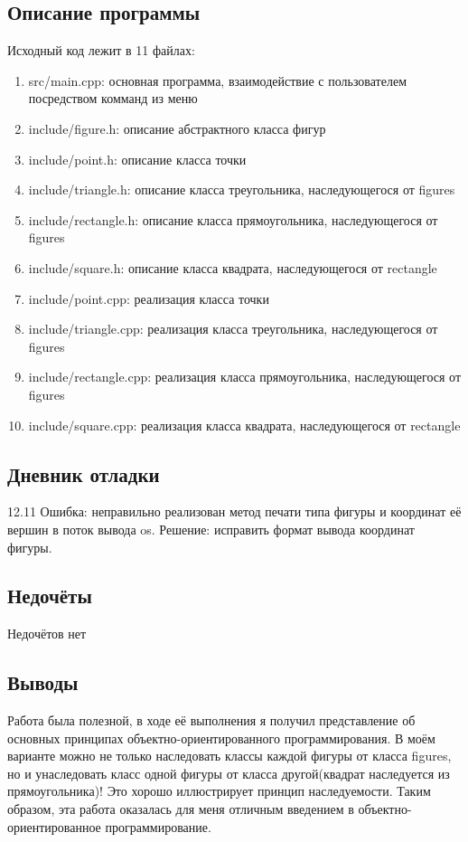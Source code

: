 \documentclass[12pt]{article}
\begin{document}
\subsection*{Описание программы}

Исходный код лежит в 11 файлах:
\begin{enumerate}
\item src/main.cpp: основная программа, взаимодействие с пользователем посредством комманд из меню

\item include/figure.h:    описание абстрактного класса фигур

\item include/point.h:     описание класса точки
\item include/triangle.h:  описание класса треугольника, наследующегося от figures
\item include/rectangle.h: описание класса прямоугольника, наследующегося от figures
\item include/square.h:    описание класса квадрата, наследующегося от rectangle

\item include/point.cpp:     реализация класса точки
\item include/triangle.cpp:  реализация класса треугольника, наследующегося от figures
\item include/rectangle.cpp: реализация класса прямоугольника, наследующегося от figures
\item include/square.cpp:    реализация класса квадрата, наследующегося от rectangle

\end{enumerate}

\subsection*{Дневник отладки}
12.11 Ошибка: неправильно реализован метод печати типа фигуры и координат её вершин в поток вывода os.
\newline Решение: исправить формат вывода координат фигуры.

\subsection*{Недочёты}
Недочётов нет

\subsection*{Выводы}
Работа была полезной, в ходе её выполнения я получил представление об основных принципах объектно-ориентированного программирования. В моём варианте можно не только наследовать классы каждой фигуры от класса figures, но и унаследовать класс одной фигуры от класса другой(квадрат наследуется из прямоугольника)! Это хорошо иллюстрирует принцип наследуемости. Таким образом, эта работа оказалась для меня отличным введением в объектно-ориентированное программирование.
\end{document}
